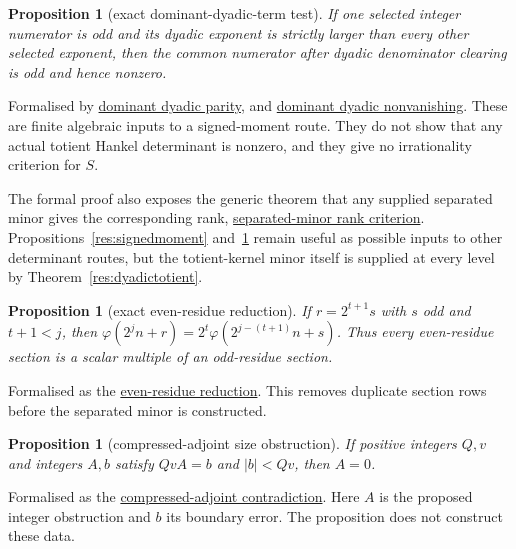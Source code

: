 \documentclass[11pt]{article}
\newcommand{\commit}{bb4e24651b37cd096d3749ef299c3317930b3a3b}
\newcommand{\repobase}{https://github.com/wcook04/plectis-lean-erdos249-257/blob/\commit}
\newcommand{\PK}{Erdos249257}
\newcommand{\lword}[4]{\href{\repobase/\PK/#1\#L#2}{#4}}
\newtheorem{proposition}[theorem]{Proposition}
\theoremstyle{definition}
\theoremstyle{remark}
\newcommand{\ph}{\varphi}
\begin{document}
{\begin{proposition}[exact dominant-dyadic-term test]\label{res:dominantdyadic}
If one selected integer numerator is odd and its dyadic exponent is strictly
larger than every other selected exponent, then the common numerator after
dyadic denominator clearing is odd and hence nonzero.
\end{proposition}
\noindent Formalised by
\lword{SignedQMomentObstruction.lean}{78}{scaled_dyadic_sum_odd}{dominant dyadic parity}, and
\lword{SignedQMomentObstruction.lean}{96}{scaled_dyadic_sum_ne_zero}{dominant dyadic nonvanishing}.
These are finite algebraic inputs to a signed-moment route.  They do not show
that any actual totient Hankel determinant is nonzero, and they give no
irrationality criterion for $S$.

The formal proof also exposes the generic theorem that any supplied separated
minor gives the corresponding rank,
\lword{TotientMahlerDefect.lean}{111}{finrank_canonicalTotientKernel_eq_of_certificate}{separated-minor rank criterion}.
Propositions~\ref{res:signedmoment} and~\ref{res:dominantdyadic} remain useful
as possible inputs to other determinant routes, but the totient-kernel minor
itself is supplied at every level by Theorem~\ref{res:dyadictotient}.

\begin{proposition}[exact even-residue reduction]\label{res:evenresidue}
If $r=2^{t+1}s$ with $s$ odd and $t+1<j$, then
$\ph(2^jn+r)=2^t\ph(2^{j-(t+1)}n+s)$.  Thus every even-residue section is a
scalar multiple of an odd-residue section.
\end{proposition}
\noindent Formalised as the
\lword{TotientMahlerDefect.lean}{169}{totientKernel_even_residue_reduce}{even-residue reduction}.
This removes duplicate section rows before the separated minor is constructed.

\begin{proposition}[compressed-adjoint size obstruction]\label{res:compressedadjoint}
If positive integers $Q,v$ and integers $A,b$ satisfy $QvA=b$ and
$|b|<Qv$, then $A=0$.
\end{proposition}
\noindent Formalised as the
\lword{TotientMahlerDefect.lean}{1183}{false_of_compressedAdjointCertificate}{compressed-adjoint contradiction}.
Here $A$ is the proposed integer obstruction and $b$ its boundary error.  The
proposition does not construct these data.

}
\end{document}
